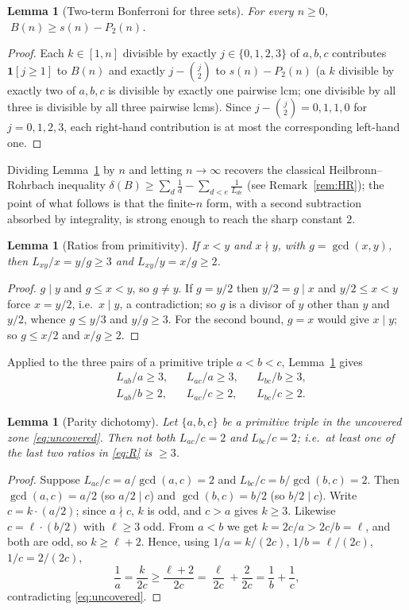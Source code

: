 \documentclass[11pt]{article}
\newtheorem{lemma}[theorem]{Lemma}
\theoremstyle{remark}
\newcommand{\dens}{\delta}          %
\begin{document}
\begin{lemma}[Two-term Bonferroni for three sets]\label{lem:bonf}
For every $n\ge 0$, $\;B(n)\ge s(n)-P_2(n)$.
\end{lemma}
\begin{proof}
Each $k\in[1,n]$ divisible by exactly $j\in\{0,1,2,3\}$ of $a,b,c$ contributes
$\mathbf 1[j\ge1]$ to $B(n)$ and exactly $j-\binom j2$ to $s(n)-P_2(n)$ (a $k$
divisible by exactly two of $a,b,c$ is divisible by exactly one pairwise lcm; one
divisible by all three is divisible by all three pairwise lcms). Since
$j-\binom j2=0,1,1,0$ for $j=0,1,2,3$, each right-hand contribution is at most the
corresponding left-hand one.
\end{proof}

Dividing Lemma~\ref{lem:bonf} by $n$ and letting $n\to\infty$ recovers the
classical Heilbronn--Rohrbach inequality $\dens(B)\ge\sum_d\frac1d-\sum_{d<e}
\frac1{L_{de}}$ (see Remark~\ref{rem:HR}); the point of what follows is that the
finite-$n$ form, with a second subtraction absorbed by integrality, is strong
enough to reach the sharp constant $2$.

\begin{lemma}[Ratios from primitivity]\label{lem:ratio}
If $x<y$ and $x\nmid y$, with $g=\gcd(x,y)$, then
$L_{xy}/x=y/g\ge 3$ and $L_{xy}/y=x/g\ge 2$.
\end{lemma}
\begin{proof}
$g\mid y$ and $g\le x<y$, so $g\ne y$. If $g=y/2$ then $y/2=g\mid x$ and
$y/2\le x<y$ force $x=y/2$, i.e.\ $x\mid y$, a contradiction; so $g$ is a divisor
of $y$ other than $y$ and $y/2$, whence $g\le y/3$ and $y/g\ge 3$. For the second
bound, $g=x$ would give $x\mid y$; so $g\le x/2$ and $x/g\ge 2$.
\end{proof}

Applied to the three pairs of a primitive triple $a<b<c$, Lemma~\ref{lem:ratio}
gives
\begin{equation}\label{eq:R}
\begin{aligned}
&L_{ab}/a\ge 3, && L_{ac}/a\ge 3, && L_{bc}/b\ge 3, \\
&L_{ab}/b\ge 2, && L_{ac}/c\ge 2, && L_{bc}/c\ge 2.
\end{aligned}
\end{equation}

\begin{lemma}[Parity dichotomy]\label{lem:parity}
Let $\{a,b,c\}$ be a primitive triple in the uncovered zone \eqref{eq:uncovered}.
Then not both $L_{ac}/c=2$ and $L_{bc}/c=2$; i.e.\ at least one of the last two
ratios in \eqref{eq:R} is $\ge 3$.
\end{lemma}
\begin{proof}
Suppose $L_{ac}/c=a/\gcd(a,c)=2$ and $L_{bc}/c=b/\gcd(b,c)=2$. Then
$\gcd(a,c)=a/2$ (so $a/2\mid c$) and $\gcd(b,c)=b/2$ (so $b/2\mid c$). Write
$c=k\cdot(a/2)$; since $a\nmid c$, $k$ is odd, and $c>a$ gives $k\ge 3$. Likewise
$c=\ell\cdot(b/2)$ with $\ell\ge 3$ odd. From $a<b$ we get
$k=2c/a>2c/b=\ell$, and both are odd, so $k\ge\ell+2$. Hence, using
$1/a=k/(2c)$, $1/b=\ell/(2c)$, $1/c=2/(2c)$,
\[
  \frac1a=\frac{k}{2c}\ge\frac{\ell+2}{2c}=\frac{\ell}{2c}+\frac{2}{2c}
        =\frac1b+\frac1c,
\]
contradicting \eqref{eq:uncovered}.
\end{proof}
\end{document}
